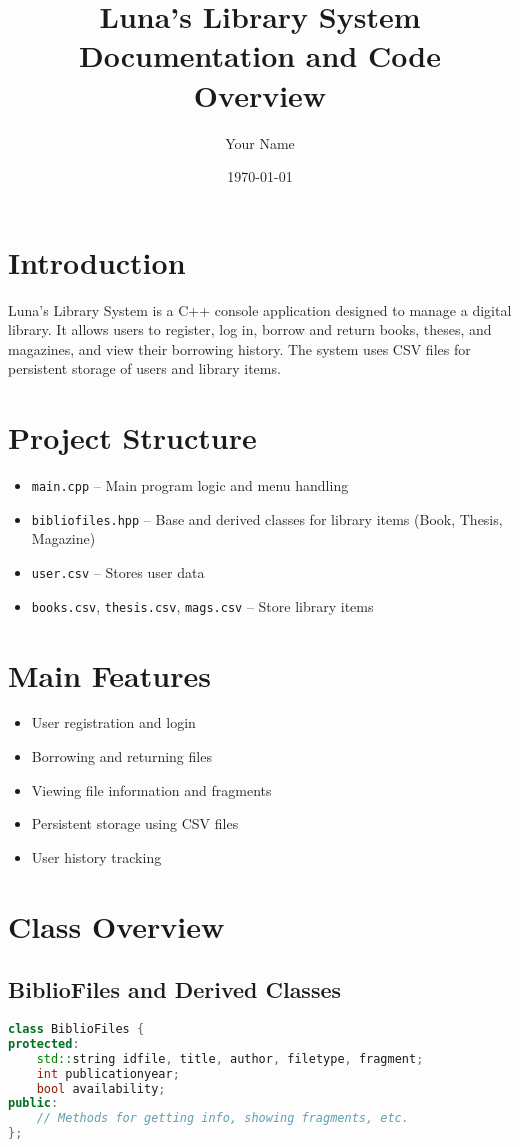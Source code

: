 \documentclass[a4paper,12pt]{article}
\title{Luna's Library System \\
\vspace{0.5em}
\large Documentation and Code Overview}
\author{Your Name}
\date{\today}
\begin{document}
\maketitle

\tableofcontents

\section{Introduction}
Luna's Library System is a C++ console application designed to manage a digital library. It allows users to register, log in, borrow and return books, theses, and magazines, and view their borrowing history. The system uses CSV files for persistent storage of users and library items.

\section{Project Structure}
\begin{itemize}
    \item \texttt{main.cpp} -- Main program logic and menu handling
    \item \texttt{bibliofiles.hpp} -- Base and derived classes for library items (Book, Thesis, Magazine)
    \item \texttt{user.csv} -- Stores user data
    \item \texttt{books.csv}, \texttt{thesis.csv}, \texttt{mags.csv} -- Store library items
\end{itemize}

\section{Main Features}
\begin{itemize}
    \item User registration and login
    \item Borrowing and returning files
    \item Viewing file information and fragments
    \item Persistent storage using CSV files
    \item User history tracking
\end{itemize}

\section{Class Overview}

\subsection{BiblioFiles and Derived Classes}
\begin{lstlisting}[language=C++, caption={BiblioFiles Base Class}]
class BiblioFiles {
protected:
    std::string idfile, title, author, filetype, fragment;
    int publicationyear;
    bool availability;
public:
    // Methods for getting info, showing fragments, etc.
};
\end{lstlisting}
\end{document}
